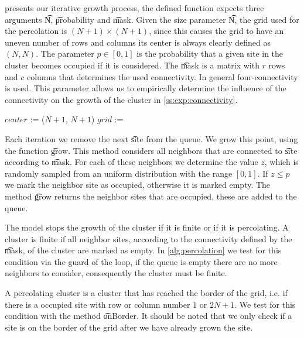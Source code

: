  presents our iterative growth process, the defined function expects three arguments \t{N}, \t{probability} and \t{mask}. Given the size parameter \t{N}, the grid used for the percolation is $(N + 1) \times (N + 1)$, since this causes the grid to have an uneven number of rows and columns its center is always clearly defined as $(N, N)$. The parameter $p \in [0, 1]$ is the probability that a given site in the cluster becomes occupied if it is considered. The \t{mask} is a matrix with $r$ rows and $c$ columns that determines the used connectivity. In general four-connectivity is used. This parameter allows us to empirically determine the influence of the connectivity on the growth of the cluster in \cref{ss:exp:connectivity}.


\begin{algorithm}[t]
	\SetAlgoShortEnd
	\DontPrintSemicolon
	\BlankLine

	$center$ := ($N + 1$, $N + 1$)\; 
	\; 
	$grid$ := \; 

	\; 
	\caption{$(mask, N, p)$\label{alg:percolation}}
\end{algorithm}

Each iteration we remove the next \t{site} from the queue. We grow this point, using the function \t{grow}. This method considers all neighbors that are connected to \t{site} according to \t{mask}. For each of these neighbors we determine the value $z$, which is randomly sampled from an uniform distribution with the range $[0,1]$. If $z \leq p$ we mark the neighbor site as occupied, otherwise it is marked empty. The method \t{grow} returns the neighbor sites that are occupied, these are added to the queue. 

The model stops the growth of the cluster if it is finite or if it is percolating. A cluster is finite if all neighbor sites, according to the connectivity defined by the \t{mask}, of the cluster are marked as empty. In \cref{alg:percolation} we test for this condition via the guard of the loop, if the queue is empty there are no more neighbors to consider, consequently the cluster must be finite. 

A percolating cluster is a cluster that has reached the border of the grid, i.e. if there is a occupied site with row or column number $1$ or $2N + 1$. We test for this condition with the method \t{onBorder}. It should be noted that we only check if a site is on the border of the grid after we have already grown the site. 


